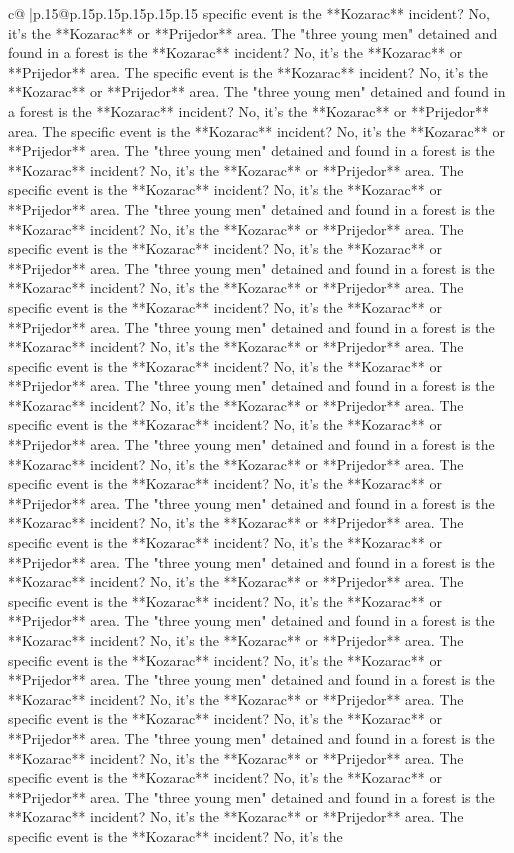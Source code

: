 \documentclass{article}
\begin{document}
{\begin{supertabular}{c@{$\;$}|p{.15\linewidth}@{}p{.15\linewidth}p{.15\linewidth}p{.15\linewidth}p{.15\linewidth}p{.15\linewidth}}
{{{specific event is the **Kozarac** incident? No, it's the **Kozarac** or **Prijedor** area. The "three young men" detained and found in a forest is the **Kozarac** incident? No, it's the **Kozarac** or **Prijedor** area. The specific event is the **Kozarac** incident? No, it's the **Kozarac** or **Prijedor** area. The "three young men" detained and found in a forest is the **Kozarac** incident? No, it's the **Kozarac** or **Prijedor** area. The specific event is the **Kozarac** incident? No, it's the **Kozarac** or **Prijedor** area. The "three young men" detained and found in a forest is the **Kozarac** incident? No, it's the **Kozarac** or **Prijedor** area. The specific event is the **Kozarac** incident? No, it's the **Kozarac** or **Prijedor** area. The "three young men" detained and found in a forest is the **Kozarac** incident? No, it's the **Kozarac** or **Prijedor** area. The specific event is the **Kozarac** incident? No, it's the **Kozarac** or **Prijedor** area. The "three young men" detained and found in a forest is the **Kozarac** incident? No, it's the **Kozarac** or **Prijedor** area. The specific event is the **Kozarac** incident? No, it's the **Kozarac** or **Prijedor** area. The "three young men" detained and found in a forest is the **Kozarac** incident? No, it's the **Kozarac** or **Prijedor** area. The specific event is the **Kozarac** incident? No, it's the **Kozarac** or **Prijedor** area. The "three young men" detained and found in a forest is the **Kozarac** incident? No, it's the **Kozarac** or **Prijedor** area. The specific event is the **Kozarac** incident? No, it's the **Kozarac** or **Prijedor** area. The "three young men" detained and found in a forest is the **Kozarac** incident? No, it's the **Kozarac** or **Prijedor** area. The specific event is the **Kozarac** incident? No, it's the **Kozarac** or **Prijedor** area. The "three young men" detained and found in a forest is the **Kozarac** incident? No, it's the **Kozarac** or **Prijedor** area. The specific event is the **Kozarac** incident? No, it's the **Kozarac** or **Prijedor** area. The "three young men" detained and found in a forest is the **Kozarac** incident? No, it's the **Kozarac** or **Prijedor** area. The specific event is the **Kozarac** incident? No, it's the **Kozarac** or **Prijedor** area. The "three young men" detained and found in a forest is the **Kozarac** incident? No, it's the **Kozarac** or **Prijedor** area. The specific event is the **Kozarac** incident? No, it's the **Kozarac** or **Prijedor** area. The "three young men" detained and found in a forest is the **Kozarac** incident? No, it's the **Kozarac** or **Prijedor** area. The specific event is the **Kozarac** incident? No, it's the **Kozarac** or **Prijedor** area. The "three young men" detained and found in a forest is the **Kozarac** incident? No, it's the **Kozarac** or **Prijedor** area. The specific event is the **Kozarac** incident? No, it's the **Kozarac** or **Prijedor** area. The "three young men" detained and found in a forest is the **Kozarac** incident? No, it's the **Kozarac** or **Prijedor** area. The specific event is the **Kozarac** incident? No, it's the }}}
\end{supertabular}}
\end{document}
